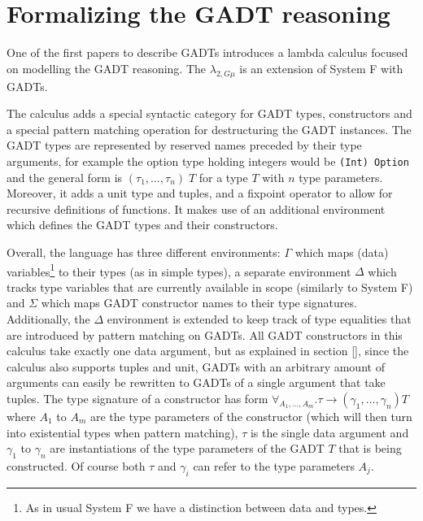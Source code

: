 \section{Formalizing the GADT reasoning}
\label{introlam}

One of the first papers to describe GADTs \cite{XiGRDT} introduces a lambda calculus focused on modelling the GADT reasoning. The $\lambda_{2,G\mu}$ is an extension of System F \cite{girard_prot} with GADTs.

The calculus adds a special syntactic category for GADT types, constructors and a special pattern matching operation for destructuring the GADT instances. The GADT types are represented by reserved names preceded by their type arguments, for example the option type holding integers would be \texttt{(Int) Option} and the general form is $(\tau_1, ..., \tau_n) \; T$ for a type $T$ with $n$ type parameters. Moreover, it adds a unit type and tuples, and a fixpoint operator to allow for recursive definitions of functions. It makes use of an additional environment which defines the GADT types and their constructors. 


Overall, the language has three different environments: $\Gamma$ which maps (data) variables\footnote{As in usual System F we have a distinction between data and types.} to their types (as in simple types), a separate environment $\Delta$ which tracks type variables that are currently available in scope (similarly to System F) and $\Sigma$ which maps GADT constructor names to their type signatures. Additionally, the $\Delta$ environment is extended to keep track of type equalities that are introduced by pattern matching on GADTs. All GADT constructors in this calculus take exactly one data argument, but as explained in section \ref{}, since the calculus also supports tuples and unit, GADTs with an arbitrary amount of arguments can easily be rewritten to GADTs of a single argument that take tuples. The type signature of a constructor has form $\forall_{A_1, ..., A_m}. \tau \to (\gamma_1, ..., \gamma_n) T$ where $A_1$ to $A_m$ are the type parameters of the constructor (which will then turn into existential types when pattern matching), $\tau$ is the single data argument and $\gamma_1$ to $\gamma_n$ are instantiations of the type parameters of the GADT $T$ that is being constructed. Of course both $\tau$ and $\gamma_i$ can refer to the type parameters $A_j$.

